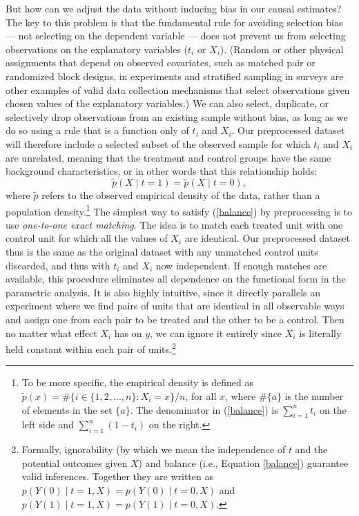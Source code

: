 \documentclass[11pt,titlepage]{article}
\begin{document}
But how can we adjust the data without inducing bias in our causal
estimates?  The key to this problem is that the fundamental rule for
avoiding selection bias --- not selecting on the dependent variable
--- does not prevent us from selecting observations on the explanatory
variables ($t_i$ or $X_i$).  (Random or other physical assignments
that depend on observed covariates, such as matched pair or randomized
block designs, in experiments and stratified sampling in surveys are
other examples of valid data collection mechanisms that select
observations given chosen values of the explanatory variables.)  We
can also select, duplicate, or selectively drop observations from an
existing sample without bias, as long as we do so using a rule that is
a function only of $t_i$ and $X_i$.  Our preprocessed dataset will
therefore include a selected subset of the observed sample for which
$t_i$ and $X_i$ are unrelated, meaning that the treatment and control
groups have the same background characteristics, or in other words
that this relationship holds:
\begin{equation}
  \label{balance}
  \tilde p(X\mid t=1) = \tilde p(X\mid t=0),
\end{equation}
where $\tilde p$ refers to the observed empirical density of the data,
rather than a population density.\footnote{To be more specific, the
  empirical density is defined as $\tilde p(x) = \# \{ i\in \{1, 2,
  \dots, n \}: X_i = x \} / n$, for all $x$, where $\#\{a\}$ is the
  number of elements in the set $\{a\}$.  The denominator in
  (\ref{balance}) is $\sum_{i=1}^n t_i$ on the left side and
  $\sum_{i=1}^n (1-t_i)$ on the right.}  The simplest way to satisfy
(\ref{balance}) by preprocessing is to use \emph{one-to-one exact
  matching}.  The idea is to match each treated unit with one control
unit for which all the values of $X_i$ are identical.  Our
preprocessed dataset thus is the same as the original dataset with any
unmatched control units discarded, and thus with $t_i$ and $X_i$ now
independent.  If enough matches are available, this procedure
eliminates all dependence on the functional form in the parametric
analysis.  It is also highly intuitive, since it directly parallels an
experiment where we find pairs of units that are identical in all
observable ways and assign one from each pair to be treated and the
other to be a control.  Then no matter what effect $X_i$ has on $y$,
we can ignore it entirely since $X_i$ is literally held constant
within each pair of units.\footnote{Formally, ignorability (by which
  we mean the independence of $t$ and the potential outcomes given
  $X$) and balance (i.e., Equation \ref{balance}) guarantee valid
  inferences.  Together they are written as $p(Y(0)\mid
  t=1,X)=p(Y(0)\mid t=0,X)$ and $p(Y(1)\mid t=1,X)=p(Y(1)\mid
  t=0,X)$.}
\end{document}
